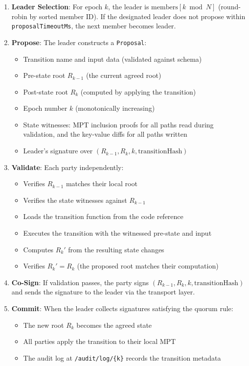 \documentclass[11pt,a4paper]{article}
\begin{document}
\begin{enumerate}[nosep]
  \item \textbf{Leader Selection}: For epoch $k$, the leader is
    $\text{members}[k \bmod N]$ (round-robin by sorted member ID). If the
    designated leader does not propose within \texttt{proposalTimeoutMs}, the
    next member becomes leader.

  \item \textbf{Propose}: The leader constructs a \texttt{Proposal}:
    \begin{itemize}[nosep]
      \item Transition name and input data (validated against schema)
      \item Pre-state root $R_{k-1}$ (the current agreed root)
      \item Post-state root $R_k$ (computed by applying the transition)
      \item Epoch number $k$ (monotonically increasing)
      \item State witnesses: MPT inclusion proofs for all paths read during
        validation, and the key-value diffs for all paths written
      \item Leader's signature over $(R_{k-1}, R_k, k, \text{transitionHash})$
    \end{itemize}

  \item \textbf{Validate}: Each party independently:
    \begin{itemize}[nosep]
      \item Verifies $R_{k-1}$ matches their local root
      \item Verifies the state witnesses against $R_{k-1}$
      \item Loads the transition function from the code reference
      \item Executes the transition with the witnessed pre-state and input
      \item Computes $R_k'$ from the resulting state changes
      \item Verifies $R_k' = R_k$ (the proposed root matches their computation)
    \end{itemize}

  \item \textbf{Co-Sign}: If validation passes, the party signs
    $(R_{k-1}, R_k, k, \text{transitionHash})$ and sends the signature to
    the leader via the transport layer.

  \item \textbf{Commit}: When the leader collects signatures satisfying the
    quorum rule:
    \begin{itemize}[nosep]
      \item The new root $R_k$ becomes the agreed state
      \item All parties apply the transition to their local MPT
      \item The audit log at \texttt{/audit/log/\{k\}} records the transition
        metadata
    \end{itemize}


\end{enumerate}
\end{document}
